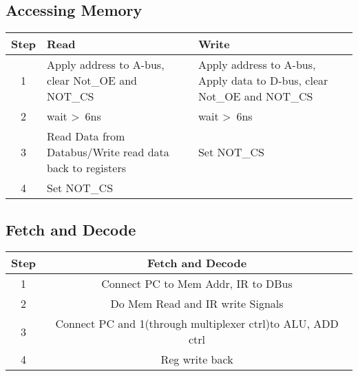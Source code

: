 \documentclass[a4paper, 12pt]{article}
\begin{document}
	\subsection{Accessing Memory}
	\begin{center}
		\begin{tabular}{|c|p{6cm}|p{6cm}|}
			\hline
			Step & Read & Write \\ \hline
			1 & Apply address to A-bus, clear Not\_OE and NOT\_CS & Apply address to A-bus, Apply data to D-bus, clear Not\_OE and NOT\_CS \\ \hline
			2 & wait \textgreater\ 6ns  & wait \textgreater\ 6ns \\ \hline
			3 & Read Data from Databus/Write read data back to registers & Set NOT\_CS \\ \hline
			4 & Set NOT\_CS  & \\ \hline
		\end{tabular}
	\end{center}
	\subsection{Fetch and Decode}
	\begin{center}
		\begin{tabular}{|c|c|}
			\hline
			Step & Fetch and Decode \\ \hline
			1 & Connect PC to Mem Addr, IR to DBus \\ \hline
			2 & Do Mem Read and IR write Signals \\ \hline
			3 & Connect PC and 1(through multiplexer ctrl)to ALU, ADD ctrl \\ \hline
			4 & Reg write back \\ \hline
		\end{tabular}
	\end{center}	
	\newpage
\end{document}
